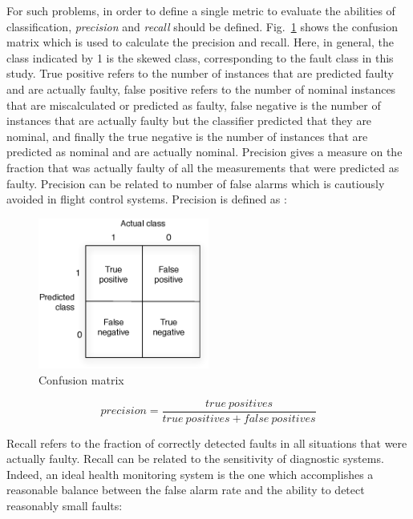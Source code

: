 For such problems, in order to define a single metric to evaluate the abilities of classification, \emph{precision} and \emph{recall} should be defined.   
Fig.~\ref{fig:confusionMatrix} shows the confusion matrix which is used to calculate the precision and recall. 
Here, in general, the class indicated by 1 is the skewed class, corresponding to the fault class in this study. 
True positive refers to the number of instances that are predicted faulty and are actually faulty, false positive refers to the number of nominal instances that are miscalculated or predicted as faulty, false negative is the number of instances that are actually faulty but the classifier predicted that they are nominal, and finally the true negative is the number of instances that are predicted as nominal and are actually nominal.
Precision gives a measure on the fraction that was actually faulty of all the measurements that were predicted as faulty. 
Precision can be related to number of false alarms which is cautiously avoided in flight control systems. Precision is defined as :

\begin{figure}
\begin{center}
\includegraphics[width=0.5\textwidth]{figures/confusionMatrix}    %
\caption{Confusion matrix} 
\label{fig:confusionMatrix}
\end{center}
\end{figure}


\begin{equation}
precision = \frac{true \ positives}{true \ positives + false \ positives}
\end{equation}

Recall refers to the fraction of correctly detected faults in all situations that were actually faulty. 
Recall can be related to the sensitivity of diagnostic systems. 
Indeed, an ideal health monitoring system is the one which accomplishes a reasonable balance between the false alarm rate and the ability to detect reasonably small faults:

